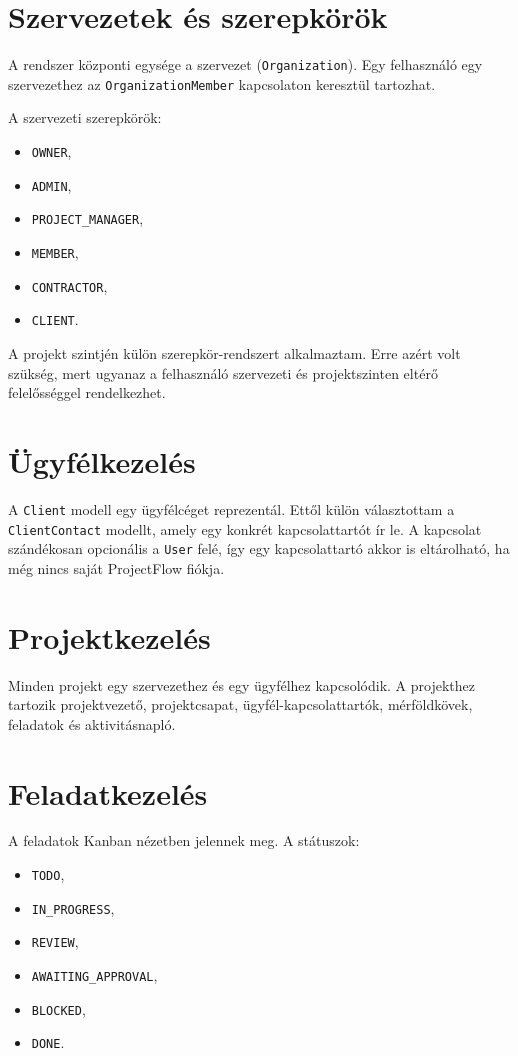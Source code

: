 \documentclass[11pt,a4paper]{report}
\newcommand{\projectname}{ProjectFlow}
\begin{document}
    \section{Szervezetek és szerepkörök}

    A rendszer központi egysége a szervezet (\texttt{Organization}). Egy
    felhasználó egy szervezethez az \texttt{OrganizationMember} kapcsolaton
    keresztül tartozhat.

    A szervezeti szerepkörök:
    \begin{itemize}
        \item \texttt{OWNER},
        \item \texttt{ADMIN},
        \item \texttt{PROJECT\_MANAGER},
        \item \texttt{MEMBER},
        \item \texttt{CONTRACTOR},
        \item \texttt{CLIENT}.
    \end{itemize}

    A projekt szintjén külön szerepkör-rendszert alkalmaztam. Erre azért volt
    szükség, mert ugyanaz a felhasználó szervezeti és projektszinten eltérő
    felelősséggel rendelkezhet.

    \section{Ügyfélkezelés}

    A \texttt{Client} modell egy ügyfélcéget reprezentál. Ettől külön választottam
    a \texttt{ClientContact} modellt, amely egy konkrét kapcsolattartót ír le.
    A kapcsolat szándékosan opcionális a \texttt{User} felé, így egy kapcsolattartó
    akkor is eltárolható, ha még nincs saját \projectname{} fiókja.

    \section{Projektkezelés}

    Minden projekt egy szervezethez és egy ügyfélhez kapcsolódik. A projekthez
    tartozik projektvezető, projektcsapat, ügyfél-kapcsolattartók, mérföldkövek,
    feladatok és aktivitásnapló.

    \section{Feladatkezelés}

    A feladatok Kanban nézetben jelennek meg. A státuszok:
    \begin{itemize}
        \item \texttt{TODO},
        \item \texttt{IN\_PROGRESS},
        \item \texttt{REVIEW},
        \item \texttt{AWAITING\_APPROVAL},
        \item \texttt{BLOCKED},
        \item \texttt{DONE}.
    \end{itemize}
\end{document}
